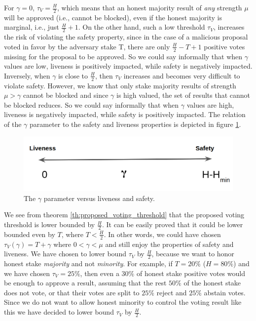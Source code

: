 For $\gamma = 0$, $\tau_V = \frac{H}{2}$, which means that an honest majority 
result of \emph{any} strength $\mu$ will be approved (i.e., cannot be blocked), 
even if the honest majority is marginal, i.e., just $\frac{H}{2} + 1$. On the 
other hand, such a low threshold $\tau_V$, increases the risk of violating the 
safety property, since in the case of a malicious proposal voted in favor by 
the adversary stake T, there are only $\frac{H}{2} - T + 1$ positive votes 
missing for the proposal to be approved. So we could say informally that when 
$\gamma$ values are low, liveness is positively impacted, while safety is 
negatively impacted. Inversely, when $\gamma$ is close to $\frac{H}{2}$, then 
$\tau_V$ increases and becomes very difficult to violate safety. However, we 
know that only stake majority results of strength $\mu>\gamma$ cannot be 
blocked and since $\gamma$ is high valued, the set of results that cannot be 
blocked reduces. So we could say informally that when $\gamma$ values are high, 
liveness is negatively impacted, while safety is positively impacted. The 
relation of the $\gamma$ parameter to the safety and liveness properties is 
depicted in figure \ref{fig:gamma_parameter}.

\begin{figure}[h!] %
	\centering
	\includegraphics[width=0.6\columnwidth,
	keepaspectratio]{figures/gamma.png}
	\caption{The $\gamma$ parameter versus liveness and safety.}
	\label{fig:gamma_parameter}
\end{figure}

We see from theorem \ref{th:proposed_voting_threshold} that the proposed voting 
threshold is lower bounded by $\frac{H}{2}$. It can be easily proved that it 
could be lower bounded even by $T$, where $T < \frac{H}{2}$. In other words, we 
could have chosen $\tau_V(\gamma) = T + \gamma$ where $0 < \gamma < \mu$ and 
still enjoy the properties of safety and liveness. We have chosen to lower 
bound $\tau_V$ by $\frac{H}{2}$, because we want to honor honest stake 
\emph{majority} and not \emph{minority}. For example, if $T=20\%$ ($H=80\%$) 
and we have 
chosen 
$\tau_V = 25\%$, then even a $30\%$ of honest stake positive votes would be 
enough to approve a result, assuming that the rest $50\%$ of 
the honest stake does not vote, or that their votes are split to $25\%$ reject 
and $25\%$ abstain votes. Since we do not want to allow honest minority to 
control the voting result like this we have decided to lower bound $\tau_V$ by 
$\frac{H}{2}$.

